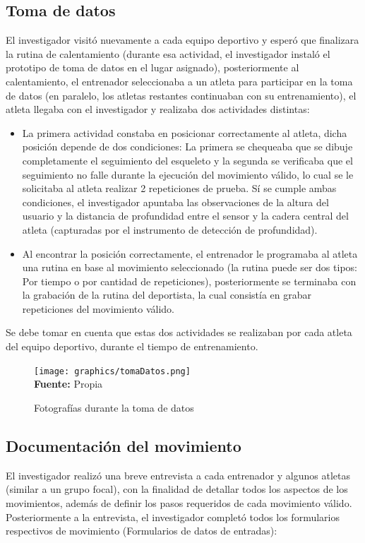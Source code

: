 \subsection{Toma de datos}
El investigador visit\'o nuevamente a cada equipo deportivo y esper\'o que finalizara la rutina de calentamiento (durante esa actividad, el investigador instal\'o el prototipo de toma de datos en el lugar asignado), posteriormente al calentamiento, el entrenador seleccionaba a un atleta para participar en la toma de datos (en paralelo, los atletas restantes continuaban con su entrenamiento), el atleta llegaba con el investigador y realizaba dos actividades distintas:
\begin{itemize}
\item La primera actividad constaba en posicionar correctamente al atleta, dicha posici\'on depende de dos condiciones: La primera se chequeaba que se dibuje completamente el seguimiento del esqueleto y la segunda se verificaba que el seguimiento no falle durante la ejecuci\'on del movimiento v\'alido, lo cual se le solicitaba al atleta realizar 2 repeticiones de prueba. S\'i se cumple ambas condiciones, el investigador apuntaba las observaciones de la altura del usuario y la distancia de profundidad entre el sensor y la cadera central del atleta (capturadas por el instrumento de detecci\'on de profundidad).
\item Al encontrar la posici\'on correctamente, el entrenador le programaba al atleta una rutina en base al movimiento seleccionado (la rutina puede ser dos tipos: Por tiempo o por cantidad de repeticiones), posteriormente se terminaba con la grabaci\'on de la rutina del deportista, la cual consist\'ia en grabar repeticiones del movimiento v\'alido.
\end{itemize}
Se debe tomar en cuenta que estas dos actividades se realizaban por cada atleta del equipo deportivo, durante el tiempo de entrenamiento.
 \begin{figure}[H]
	\caption{Fotograf\'ias durante la toma de datos}
	\label{fig:getDataStep}
	\centering
	\texttt{[image: graphics/tomaDatos.png]} \\
	\textbf{Fuente:} Propia
\end{figure} 
\subsection{Documentaci\'on del movimiento}
El investigador realiz\'o una breve entrevista a cada entrenador y algunos atletas (similar a un grupo focal), con la finalidad de detallar todos los aspectos de los movimientos, adem\'as de definir los pasos requeridos de cada movimiento v\'alido. Posteriormente a la entrevista, el investigador complet\'o todos los formularios respectivos de movimiento (Formularios de datos de entradas):
